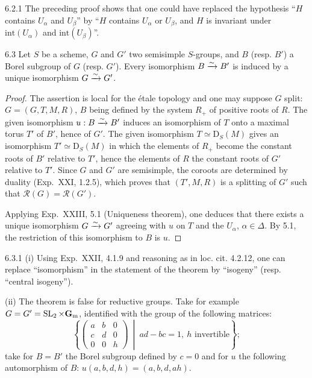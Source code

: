 \begin{remark}{6.2.1}\label{XXIV.6.2.1}
The preceding proof shows that one could have replaced the hypothesis ``$H$ contains $U_\alpha$ and $U_\beta$'' by ``$H$ contains $U_\alpha$ or $U_\beta$, and $H$ is invariant under $\mathrm{int}(U_\alpha)$ and $\mathrm{int}(U_\beta)$''.
\end{remark}
\begin{theorem}{6.3}\label{XXIV.6.3}
Let $S$ be a scheme, $G$ and $G'$ two semisimple $S$-groups, and $B$ (resp. $B'$) a Borel subgroup of $G$ (resp. $G'$). Every isomorphism $B\xrightarrow{\sim} B'$ is induced by a unique isomorphism $G\xrightarrow{\sim} G'$.
\end{theorem}
\begin{proof}
The assertion is local for the étale topology and one may suppose $G$ split: $G=(G,T,M,R)$, $B$ being defined by the system $R_+$ of positive roots of $R$. The given isomorphism $u:B\xrightarrow{\sim} B'$ induces an isomorphism of $T$ onto a maximal torus $T'$ of $B'$, hence of $G'$. The given isomorphism $T\simeq\mathrm D_S(M)$ gives an isomorphism $T'\simeq\mathrm D_S(M)$ in which the elements of $R_+$ become the constant roots of $B'$ relative to $T'$, hence the elements of $R$ the constant roots of $G'$ relative to $T'$. Since $G$ and $G'$ are semisimple, the coroots are determined by duality (Exp.~XXI, 1.2.5), which proves that $(T',M,R)$ is a splitting of $G'$ such that $\mathscr R(G)=\mathscr R(G')$.

Applying Exp.~XXIII, 5.1 (Uniqueness theorem), one deduces that there exists a unique isomorphism $G\xrightarrow{\sim} G'$ agreeing with $u$ on $T$ and the $U_\alpha$, $\alpha\in\Delta$. By 5.1, the restriction of this isomorphism to $B$ is $u$.
\end{proof}
\begin{remark}{6.3.1}\label{XXIV.6.3.1}
(i) Using Exp.~XXII, 4.1.9 and reasoning as in loc. cit. 4.2.12, one can replace ``isomorphism'' in the statement of the theorem by ``isogeny'' (resp. ``central isogeny'').

(ii) The theorem is false for reductive groups. Take for example $G=G'=\operatorname{SL}_2\times\mathbf{G}_{\mathrm{m}}$, identified with the group of the following matrices:
\[
\left\{\begin{pmatrix}a&b&0\\c&d&0\\0&0&h\end{pmatrix}\ \middle|\ ad-bc=1,\ h\text{ invertible}\right\};
\]
take for $B=B'$ the Borel subgroup defined by $c=0$ and for $u$ the following automorphism of $B$: $u(a,b,d,h)=(a,b,d,ah)$.
\end{remark}
